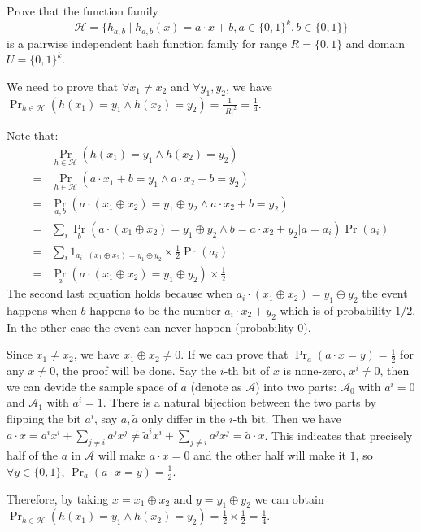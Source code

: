 \documentclass{homework}
\begin{document}
\begin{problem}
  Prove that the function family
  \begin{equation*}
    \mathcal{H} = \bigl\{ h_{a,b} \mid h_{a,b}(x) = a \cdot x + b, a\in {\{0,1\}}^{k},
    b\in \{0,1\} \bigr\}
  \end{equation*}
  is a pairwise independent hash function family for range $R = \{0,1\}$ and
  domain $U = {\{0,1\}}^{k}$.
\end{problem}

\begin{solution}
We need to prove that $\forall x_1\ne x_2$ and $\forall y_1,y_2$, we have $\Pr_{h\in\mathcal{H}}(h(x_1)=y_1\wedge h(x_2)=y_2)=\frac{1}{|R|^2} = \frac{1}{4}$.

Note that:
\begin{align*}
  &\Pr_{h\in\mathcal{H}}(h(x_1)=y_1\wedge h(x_2)=y_2)\\
  =& \Pr_{h\in\mathcal{H}}(a\cdot x_1 + b=y_1\wedge a\cdot x_2 + b=y_2)\\
  =& \Pr_{a,b}(a\cdot (x_1\oplus x_2)=y_1\oplus y_2\wedge a\cdot x_2 + b=y_2)\\
  =& \sum_{i}\Pr_{b}(a\cdot (x_1\oplus x_2)=y_1\oplus y_2\wedge b=a\cdot x_2 + y_2 | a=a_i)\Pr(a_i)\\
  =& \sum_{i}1_{a_i\cdot (x_1\oplus x_2)=y_1\oplus y_2}\times \frac{1}{2} \Pr(a_i)\\
  =& \Pr_{a}(a\cdot (x_1\oplus x_2)=y_1\oplus y_2) \times \frac{1}{2}
\end{align*}
The second last equation holds because when $a_i\cdot (x_1\oplus x_2)=y_1\oplus y_2$ the event happens when $b$ happens to be the number $a_i\cdot x_2 + y_2$ which is of probability $1/2$. In the other case the event can never happen (probability $0$).

Since $x_1\ne x_2$, we have $x_1\oplus x_2\ne 0$. If we can prove that $\Pr_{a}(a\cdot x=y)=\frac{1}{2}$ for any $x\ne 0$, the proof will be done. Say the $i$-th bit of $x$ is none-zero, $x^i\ne 0$, then we can devide the sample space of $a$ (denote as $\mathcal{A}$) into two parts: $\mathcal{A}_0$ with $a^i=0$ and $\mathcal{A}_1$ with $a^i=1$. There is a natural bijection between the two parts by flipping the bit $a^i$, say $a,\tilde{a}$ only differ in the $i$-th bit. Then we have $a\cdot x = a^ix^i + \sum_{j\ne i}a^j x^j\ne \tilde{a}^ix^i + \sum_{j\ne i}a^j x^j = \tilde{a}\cdot x$. This indicates that precisely half of the $a$ in $\mathcal{A}$ will make $a\cdot x=0$ and the other half will make it $1$, so $\forall y\in\{0,1\}$, $\Pr_{a}(a\cdot x=y)=\frac{1}{2}$.

Therefore, by taking $x = x_1\oplus x_2$ and $y = y_1\oplus y_2$ we can obtain $\Pr_{h\in\mathcal{H}}(h(x_1)=y_1\wedge h(x_2)=y_2) = \frac{1}{2}\times\frac{1}{2} = \frac{1}{4}$.
\end{solution}
\end{document}

